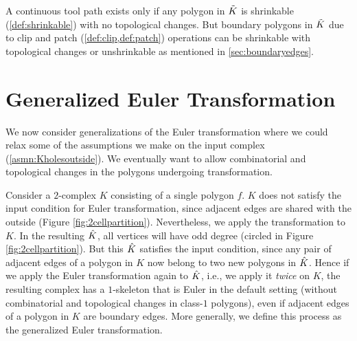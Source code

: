 \begin{rem}
  {\rm
    A continuous tool path exists only if any polygon in $\tilde{K}$ is shrinkable (\cref{def:shrinkable}) with no topological changes.
    But boundary polygons in $\tilde{K}$ due to clip and patch (\cref{def:clip,def:patch}) operations can be shrinkable with topological changes or unshrinkable as mentioned in \cref{sec:boundaryedges}.
  }
\end{rem}

\section{Generalized Euler Transformation} \label{sssec:genET}
We now consider generalizations of the Euler transformation where we could relax some of the assumptions we make on the input complex (\cref{asmn:Kholesoutside}).
We eventually want to allow combinatorial and topological changes in the polygons undergoing transformation.

Consider a $2$-complex $K$ consisting of a single polygon $f$.
$K$ does not satisfy the input condition for Euler transformation, since adjacent edges are shared with the outside (Figure \ref{fig:2cellpartition}).
Nevertheless, we apply the transformation to $K$.
In the resulting $\hat{K}$, all vertices will have odd degree (circled in Figure \ref{fig:2cellpartition}).
But this $\hat{K}$ satisfies the input condition, since any pair of adjacent edges of a polygon in $K$ now belong to two new polygons in $\hat{K}$.
Hence if we apply the Euler transformation again to $\hat{K}$, i.e., we apply it \emph{twice} on $K$, the resulting complex has a $1$-skeleton that is Euler in the default setting (without combinatorial and topological changes in class-$1$ polygons), even if adjacent edges of a polygon in $K$ are boundary edges.
More generally, we define this process as the generalized Euler transformation.


